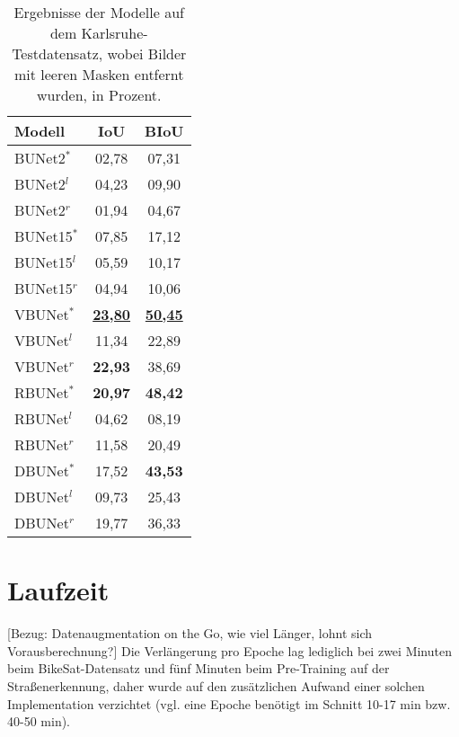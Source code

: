 \begin{table}[ht]
	\centering
	\begin{tabular}{l|cc}
		Modell & \ac{IoU} & \ac{BIoU}  \\
		\midrule
        BUNet2$^*$ & 02,78 & 07,31  \\ 
        BUNet2$^l$ & 04,23 & 09,90  \\ 
        BUNet2$^r$ & 01,94 & 04,67  \\ 
		\midrule

        BUNet15$^*$ & 07,85 & 17,12  \\ 
        BUNet15$^l$ & 05,59 & 10,17  \\ 
        BUNet15$^r$ & 04,94 & 10,06  \\ 
		\midrule

        VBUNet$^*$ & \underline{\textbf{23,80}} & \underline{\textbf{50,45}} \\ 
        VBUNet$^l$ & 11,34 & 22,89 \\ 
        VBUNet$^r$ & \textbf{22,93} & 38,69 \\ 
		\midrule

        RBUNet$^*$ & \textbf{20,97} & \textbf{48,42} \\ 
        RBUNet$^l$ & 04,62 & 08,19 \\ 
        RBUNet$^r$ & 11,58 & 20,49 \\ 
		\midrule

        DBUNet$^*$ & 17,52 & \textbf{43,53} \\ 
        DBUNet$^l$ & 09,73 & 25,43 \\ 
        DBUNet$^r$ & 19,77 & 36,33 \\ 
        
	\end{tabular}
	\caption{Ergebnisse der Modelle auf dem Karlsruhe-Testdatensatz, wobei Bilder mit leeren Masken entfernt wurden, 
    in Prozent.}
	\label{tab:results-ka-small}
\end{table}

\section{Laufzeit}

[Bezug: Datenaugmentation on the Go, wie viel Länger, lohnt sich Vorausberechnung?]
Die Verlängerung pro Epoche lag lediglich bei zwei Minuten beim BikeSat-Datensatz und fünf Minuten beim Pre-Training auf der 
Straßenerkennung, daher wurde auf den zusätzlichen Aufwand einer solchen Implementation verzichtet 
(vgl. eine Epoche benötigt im Schnitt 10-17 min bzw. 40-50 min). 


